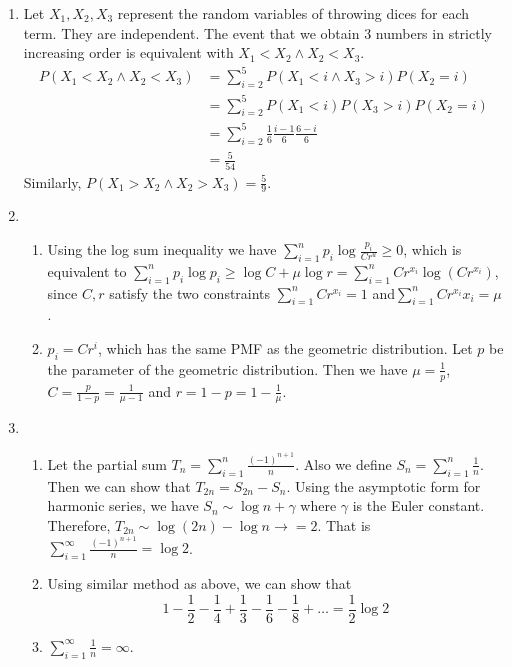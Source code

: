 \documentclass{article}
\begin{document}
\courseheader
{}

\begin{enumerate}
\item Let $X_1,X_2,X_3$ represent the
random variables of throwing dices for each term. They are independent. The event that
we obtain 3 numbers in strictly increasing
order is equivalent with $X_1<X_2 \wedge X_2 <X_3$.
\begin{align*}
    P(X_1<X_2 \wedge X_2 <X_3)
    &=\sum_{i=2}^5 P(X_1 < i \wedge X_3 > i)P(X_2=i)\\
    &=\sum_{i=2}^5 P(X_1 < i)P( X_3 > i)P(X_2=i) \\
    &=\sum_{i=2}^5  \frac{1}{6}\frac{i-1}{6}\frac{6-i}{6}\\
    &=\frac{5}{54}
\end{align*}
Similarly, $P(X_1>X_2 \wedge X_2 > X_3)=\frac{5}{9}$.
\item 
\begin{enumerate}
    \item Using the log sum inequality we have
$\sum_{i=1}^n p_i\log \frac{p_i}{C r^u} \geq 0$,
which is equivalent to
$\sum_{i=1}^n p_i\log p_i \geq \log C + \mu \log r = \sum_{i=1}^n Cr^{x_i} \log (Cr^{x_i})$, since $C, r$ satisfy the two
constraints $\sum_{i=1}^n Cr^{x_i}=1$
and$\sum_{i=1}^n Cr^{x_i}x_i=\mu$.
\item $p_i = Cr^i$, which has the same
PMF as the geometric distribution.
Let $p$ be the parameter of the
geometric distribution. Then
we have $\mu=\frac{1}{p}$,
$C=\frac{p}{1-p}=\frac{1}{\mu-1}$
and $r=1-p=1-\frac{1}{\mu}$.
\end{enumerate}
\item
\begin{enumerate}
    \item Let the partial sum $T_{n}=\sum_{i=1}^n \frac{(-1)^{n+1}}{n}$.
    Also we define
    $S_{n}=\sum_{i=1}^n \frac{1}{n}$.
    Then we can show that
    $T_{2n}=S_{2n} - S_n$. Using the asymptotic form for harmonic series,
    we have $S_n \sim \log n + \gamma$ where
    $\gamma$ is the Euler constant.
    Therefore, $T_{2n} \sim \log (2n) - \log n \to = 2$. That is
    $\sum_{i=1}^{\infty} \frac{(-1)^{n+1}}{n}=\log 2$.
    \item Using similar method as above, we can
    show that
    $$
    1-\frac{1}{2}
    -\frac{1}{4}
    + \frac{1}{3}
    -\frac{1}{6}
    -\frac{1}{8} +\dots
    = \frac{1}{2}\log 2
    $$
\item $\sum_{i=1}^{\infty} \frac{1}{n}=\infty$.
\end{enumerate}

\end{enumerate}
\end{document}
